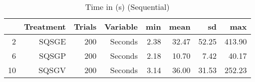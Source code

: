 \begin{table}[ht]
\centering
\begin{tabular}{rrrrrrrr}
  \hline
 & Treatment & Trials & Variable & min & mean & sd & max \\ 
  \hline
2 & SQSGE & 200 & Seconds & 2.38 & 32.47 & 52.25 & 413.90 \\ 
  6 & SQSGP & 200 & Seconds & 2.18 & 10.70 & 7.42 & 40.17 \\ 
  10 & SQSGV & 200 & Seconds & 3.14 & 36.00 & 31.53 & 252.23 \\ 
   \hline
\end{tabular}
\caption{Time in (s) (Sequential)} 
\end{table}
